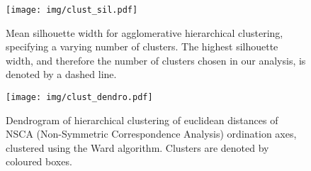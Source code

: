 \documentclass[11pt,a4paper]{article}
\begin{document}
\begin{figure}[H]
\centering
	\texttt{[image: img/clust\_sil.pdf]}
	\caption{Mean silhouette width for agglomerative hierarchical clustering, specifying a varying number of clusters. The highest silhouette width, and therefore the number of clusters chosen in our analysis, is denoted by a dashed line.}
	\label{clust_sil}
\end{figure}

\begin{figure}[H]
\centering
	\texttt{[image: img/clust\_dendro.pdf]}
	\caption{Dendrogram of hierarchical clustering of euclidean distances of NSCA (Non-Symmetric Correspondence Analysis) ordination axes, clustered using the Ward algorithm. Clusters are denoted by coloured boxes.}
	\label{clust_dendro}
\end{figure}


\end{document}
